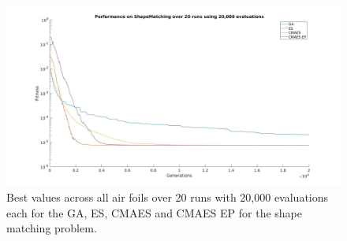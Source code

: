 \documentclass{article}
\begin{document}
\begin{figure}[H]
	\centering
	\includegraphics[width=1.0\textwidth]{img/20_runs_2000_all.jpg}
	\caption{Best values across all air foils over 20 runs with 20,000 evaluations each for the GA, ES, CMAES and CMAES EP for the shape matching problem.}
\end{figure}
\end{document}
